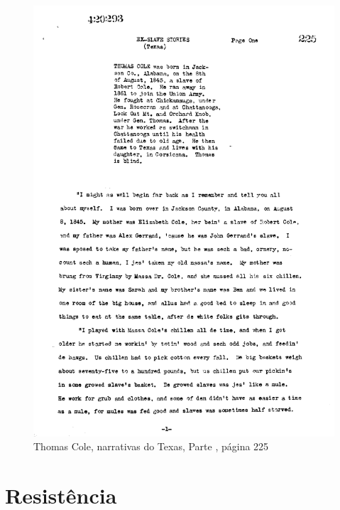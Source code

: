 \pagebreak
\thispagestyle{empty}

\begin{absolutelynopagebreak}
\begin{vplace}
\begin{figure}[H]
\begin{adjustwidth}{-1.8cm}{}
  \vspace*{-2cm}
  \includegraphics[width=130mm]{./imgs/Cap7.jpg}  
\end{adjustwidth}
  \caption{Thomas Cole, narrativas do Texas, Parte , página 225}
\end{figure}
\end{vplace}

\end{absolutelynopagebreak}

\chapter{Resistência}

